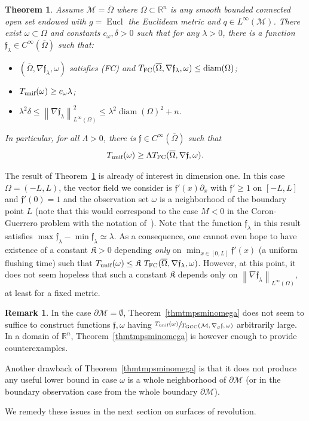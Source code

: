 \documentclass[10pt]{amsart}
\newcommand{\FC}{\textup{FC}}
\newcommand{\pFC}{\textup{(FC)}\xspace}
\newcommand{\GCC}{\textup{GCC}}
\newcommand{\unif}{\textup{unif}}
\newtheorem{theorem}[lemma]{Theorem}
\theoremstyle{definition}
\newtheorem{remark}[lemma]{Remark}
\newcommand{\M}{\ensuremath{\mathcal M}}
\newcommand{\mb}[1]{\ensuremath{\mathbb{#1}}}
\newcommand{\R}{{\mb{R}}}
\newcommand{\f}{\ensuremath{\mathfrak{f}}}
\DeclareMathOperator{\Eucl}{Eucl}
\DeclareMathOperator{\diam}{diam}
\newcommand\nablag{\nabla_{g}}
\newcommand\nor[2]{\left\|#1\right\|_{#2}}
\let\d\partial
\let\ovl\overline
\begin{document}
\begin{theorem}
\label{thm:counterexamplesomega}
Assume $\M = \ovl{\Omega}$ where $\Omega \subset \R^n$ is any smooth bounded connected open set endowed with $g=\Eucl$ the Euclidean metric and $q \in L^\infty(\M)$. There exist $\omega\subset \Omega$ and constants $c_\omega,\delta>0$ such that for any $\lambda>0$, there is a function $\f_\lambda \in C^\infty(\ovl{\Omega})$ such that:
\begin{itemize}
\item $(\ovl{\Omega},\nabla \f_\lambda,\omega)$ satisfies \pFC and $T_{\FC}(\ovl{\Omega},\nabla \f_\lambda,\omega) \leq \diam(\Omega)$;
\item $T_{\unif}(\omega)\geq c_\omega \lambda$;
\item $ \lambda^2\delta\leq \nor{\nabla \f_\lambda}{L^\infty(\Omega)}^2 \leq \lambda^2 \diam(\Omega)^{2}+n$.
\end{itemize}
In particular, for all $\Lambda >0$, there is $\f \in C^\infty(\ovl{\Omega})$ such that
\[
T_{\unif}(\omega) \geq \Lambda T_{\FC}(\ovl{\Omega},\nabla \f,\omega).
\]
\end{theorem}
The result of Theorem~\ref{thm:counterexamplesomega} is already of interest in dimension one. In this case $\Omega = (-L,L)$, the vector field we consider is $\f'(x)\d_x$ with $\f'\geq 1$ on $[-L,L]$ and $\f'(0)=1$ and the observation set $\omega$ is a neighborhood of the boundary point $L$ (note that this would correspond to the case $M<0$ in the Coron-Guerrero problem with the notation of~\cite{CG:05}).
Note that the function $\f_\lambda$ in this result satisfies $\max \f_\lambda - \min \f_\lambda \simeq \lambda$.
As a consequence, one cannot even hope to have existence of a constant $\mathfrak{K}>0$ depending {\em only} on $\min_{x\in [0,L]}\f'(x)$ (a uniform flushing time) such that $T_{\unif}(\omega) \leq \mathfrak{K} \ T_{\FC}(\ovl{\Omega},\nabla \f_\lambda,\omega)$.
However, at this point, it does not seem hopeless that such a constant $\mathfrak{K}$ depends only on $\nor{\nabla \f_\lambda}{L^\infty(\Omega)}$, at least for a fixed metric.

\begin{remark}
In the case $\d\M = \emptyset$, Theorem~\ref{thmtmpsminomega} does not seem to suffice to construct functions $\f, \omega$ having $\sfrac{T_{\unif}(\omega)}{T_{\GCC}(\M,\nablag\f,\omega)}$ arbitrarily large. In a domain of $\R^n$, Theorem~\ref{thmtmpsminomega} is however enough to provide counterexamples.

Another drawback of Theorem~\ref{thmtmpsminomega} is that it does not produce any useful lower bound in case $\omega$ is a whole neighborhood of $\d\M$ (or in the boundary observation case from the whole boundary $\d\M$).

We remedy these issues in the next section on surfaces of revolution.
\end{remark}
\end{document}

